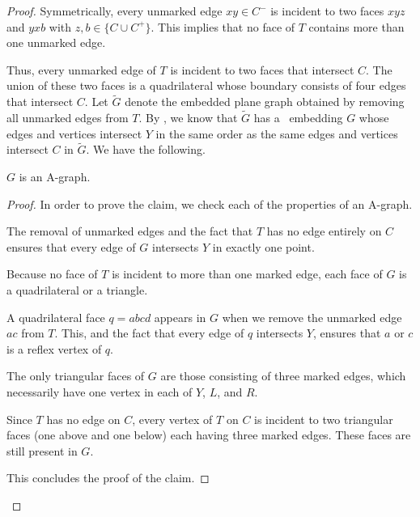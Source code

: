 \begin{proof}
	Symmetrically, every unmarked edge $xy\in C^-$ is incident to two faces
	$xyz$ and $yxb$ with $z,b\in \{C \cup C^+\}$.  This implies that no face of $T$ contains more than one unmarked edge.
	
	Thus, every unmarked edge of $T$ is incident to two faces that intersect $C$. The union of these two faces is a quadrilateral whose boundary consists of four edges that intersect $C$.
	Let $\tilde{G}$ denote the embedded plane graph obtained by removing all unmarked edges
	from $T$.  By , we know that $\tilde G$ has
	a \Fary\ embedding $G$ whose edges and vertices intersect $Y$ in the
	same order as the same edges and vertices intersect $C$ in $\tilde{G}$. We have the following.
	
	\begin{claimx} \label{claim-a-graph}
		$G$ is an A-graph.
	\end{claimx}
	
	\begin{proof}
In order to	prove the claim, we check each of the properties of an A-graph.
	
	\begin{compactenum}
		\item The removal of unmarked edges and the fact that $T$ has no
		edge entirely on $C$ ensures that every edge of $G$ intersects $Y$
		in exactly one point.
		\item Because no face of $T$ is incident to more than one marked edge,
		each face of $G$ is a quadrilateral or a triangle.  
		\item A quadrilateral face $q=abcd$ appears in $G$ when we remove the unmarked edge $ac$ from $T$. This, and the fact that every edge of $q$ intersects $Y$, ensures that $a$ or $c$ is a reflex vertex of $q$.
		\item The only triangular faces of $G$ are those consisting
		of three marked edges, which necessarily have one vertex in
		each of $Y$, $L$, and $R$.
		\item Since $T$ has no edge on $C$, every vertex of $T$ on $C$
		is incident to two triangular faces (one above and one below)
		each having three marked edges. These faces are still present in $G$.
	\end{compactenum}
This concludes the proof of the claim.
\end{proof}	


\end{proof}

